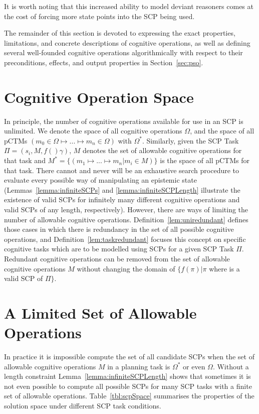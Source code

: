 It is worth noting that this increased ability to model deviant reasoners comes at the cost of forcing more state points into the SCP being used.

The remainder of this section is devoted to expressing the exact properties, limitations, and concrete descriptions of cognitive operations, as well as defining several well-founded cognitive operations algorithmically with respect to their preconditions, effects, and output properties in Section~\ref{sec:pso}.

\section{Cognitive Operation Space}
In principle, the number of cognitive operations available for use in an SCP is unlimited. We denote the space of all cognitive operations $\Omega$, and the space of all pCTMs $(m_0 \in \Omega \longmapsto ... \longmapsto m_n \in \Omega)$ with $\Omega^*$. Similarly, given the SCP Task $\Pi=(s_i,M,f() \gamma)$, $M$ denotes the set of allowable cognitive operations for that task and $M^*=\{(m_1 \longmapsto ... \longmapsto m_n| m_i \in M)\}$ is the space of all pCTMs for that task. There cannot and never will be an exhaustive search procedure to evaluate every possible way of manipulating an epistemic state (Lemmas~\ref{lemma:infiniteSCPs} and \ref{lemma:infiniteSCPLength} illustrate the existence of valid SCPs for infinitely many different cognitive operations and valid SCPs of any length, respectively). However, there are ways of limiting the number of allowable cognitive operations. Definition~\ref{lem:uniredundant} defines those cases in which there is redundancy in the set of all possible cognitive operations, and Definition~\ref{lem:taskredundant} focuses this concept on specific cognitive tasks which are to be modelled using SCPs for a given SCP Task $\Pi$. Redundant cognitive operations can be removed from the set of allowable cognitive operations $M$ without changing the domain of $\{f(\pi)|\pi$ where is a valid SCP of $\Pi\}$.


\section{A Limited Set of Allowable Operations}
In practice it is impossible compute the set of all candidate SCPs when the set of allowable cognitive operations $M$ in a planning task is $\Omega^*$ or even $\Omega$. Without a length constraint Lemma~\ref{lemma:infiniteSCPLength} shows that sometimes it is  not even possible to compute all possible SCPs for many SCP tasks with a finite set of allowable operations. Table~\ref{tbl:scpSpace} summarises the properties of the solution space under different SCP task conditions.

